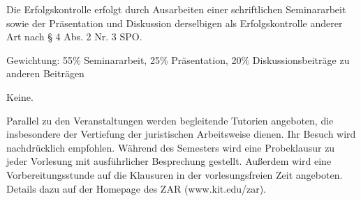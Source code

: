 \begin{course}

\setdoclanguagegerman
{}



\coursehead


\label{cour_8501.dp_997}


\begin{styleenv}
\begin{assessment}
Die Erfolgskontrolle erfolgt durch Ausarbeiten einer schriftlichen Seminararbeit sowie der Präsentation und Diskussion derselbigen als Erfolgskontrolle anderer Art nach § 4 Abs. 2 Nr. 3 SPO.

 

Gewichtung: 55\% Seminararbeit, 25\% Präsentation, 20\% Diskussionsbeiträge zu anderen Beiträgen


\end{assessment}

\begin{conditions}Keine.\end{conditions}

\begin{recommendations}Parallel zu den Veranstaltungen werden begleitende Tutorien angeboten, die insbesondere der Vertiefung der juristischen Arbeitsweise dienen. Ihr Besuch wird nachdrücklich empfohlen.\newline
Während des Semesters wird eine Probeklausur zu jeder Vorlesung mit ausführlicher Besprechung gestellt. Außerdem wird eine Vorbereitungsstunde auf die Klausuren in der vorlesungsfreien Zeit angeboten.\newline
Details dazu auf der Homepage des ZAR (www.kit.edu/zar).

\end{recommendations}
\end{styleenv}


\end{course}
